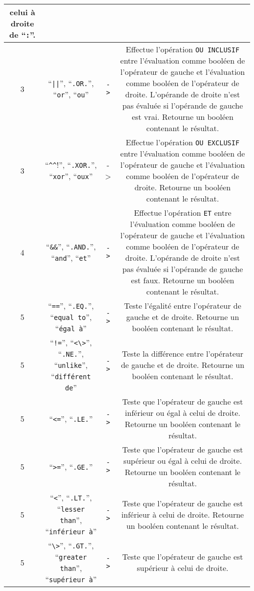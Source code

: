 \documentclass[a5paper, 12pt]{book}
\begin{document}
\begin{tabular}{c|c|c|c}
  celui à droite de ``\verb!:!''.\\
  \hline
  3 & ``\verb!||!'', ``\verb!.OR.!'', ``\verb!or!'', ``\verb!ou!'' & \verb!->! &
  Effectue l'opération \verb!OU INCLUSIF! entre l'évaluation comme booléen de
  l'opérateur de gauche et l'évaluation comme booléen de l'opérateur de droite.
  L'opérande de droite n'est pas évaluée si l'opérande de gauche est vrai.
  Retourne un booléen contenant le résultat.\\
  3 & ``\verb!^^!'', ``\verb!.XOR.!'', ``\verb!xor!'', ``\verb!oux!'' & -> &
  Effectue l'opération \verb!OU EXCLUSIF! entre l'évaluation comme booléen de
  l'opérateur de gauche et l'évaluation comme booléen de l'opérateur de droite.
  Retourne un booléen contenant le résultat.\\
  \hline
  4 & ``\verb!&&!'', ``\verb!.AND.!'', ``\verb!and!'', ``\verb!et!'' & \verb!->! &
  Effectue l'opération \verb!ET! entre l'évaluation comme booléen de
  l'opérateur de gauche et l'évaluation comme booléen de l'opérateur de droite.
  L'opérande de droite n'est pas évaluée si l'opérande de gauche est faux.
  Retourne un booléen contenant le résultat.\\
  \hline
  5 & ``\verb!==!'', ``\verb!.EQ.!'', ``\verb!equal to!'', ``\verb!égal à!'' & \verb!->! &
  Teste l'égalité entre l'opérateur de gauche et de droite.
  Retourne un booléen contenant le résultat.\\
  5 & ``\verb|!=|'', ``\verb!<\>!'', ``\verb!.NE.!'', ``\verb!unlike!'', ``\verb!différent de!'' & \verb!->! &
  Teste la différence entre l'opérateur de gauche et de droite.
  Retourne un booléen contenant le résultat.\\
  5 & ``\verb!<=!'', ``\verb!.LE.!'' & \verb!->! &
  Teste que l'opérateur de gauche est inférieur ou égal à celui de droite.
  Retourne un booléen contenant le résultat.\\
  5 & ``\verb!>=!'', ``\verb!.GE.!'' & \verb!->! &
  Teste que l'opérateur de gauche est supérieur ou égal à celui de droite.
  Retourne un booléen contenant le résultat.\\
  5 & ``\verb!<!'', ``\verb!.LT.!'', ``\verb!lesser than!'', ``\verb!inférieur à!'' & \verb!->! &
  Teste que l'opérateur de gauche est inférieur à celui de droite.
  Retourne un booléen contenant le résultat.\\
  5 & ``\verb!\>!'', ``\verb!.GT.!'', ``\verb!greater than!'', ``\verb!supérieur à!'' & \verb!->! &
  Teste que l'opérateur de gauche est supérieur à celui de droite.

\end{tabular}
\end{document}
